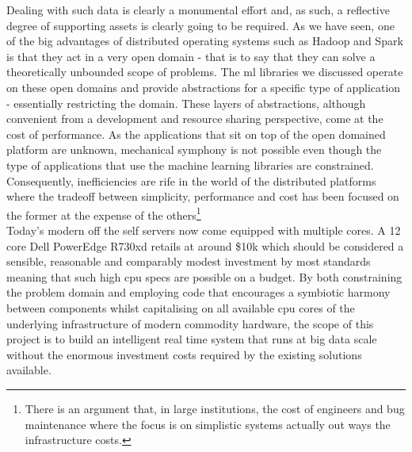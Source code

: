 \documentclass[a4paper,11pt]{scrreprt}
\begin{document}
Dealing with such data is clearly a monumental effort and, as such, a reflective degree of supporting assets is clearly going to be required. As we have seen, one of the big advantages of distributed operating systems such as Hadoop and Spark is that they act in a very open domain - that is to say that they can solve a theoretically unbounded scope of problems. The \acrshort{ml} libraries we discussed operate on these open domains and provide abstractions for a specific type of application - essentially restricting the domain. These layers of abstractions, although convenient from a development and resource sharing perspective, come at the cost of performance. As the applications that sit on top of the open domained platform are unknown, mechanical symphony is not possible even though the type of applications that use the machine learning libraries are constrained. Consequently, inefficiencies are rife in the world of the distributed platforms where the tradeoff between simplicity, performance and cost has been focused on the former at the expense of the others\footnote{There is an argument that, in large institutions, the cost of engineers and bug maintenance where the focus is on simplistic systems actually out ways the infrastructure costs.}\\

Today's modern off the self servers now come equipped with multiple cores. A 12 core Dell PowerEdge R730xd retails at around \$10k which should be considered a sensible, reasonable and comparably modest investment by most standards meaning that such high \acrshort{cpu} specs are possible on a budget. By both constraining the problem domain and employing code that encourages a symbiotic harmony between components whilst capitalising on all available \acrshort{cpu} cores of the underlying infrastructure of modern commodity hardware, the scope of this project is to build an intelligent real time system that runs at big data scale without the enormous investment costs required by the existing solutions available. 
\end{document}
